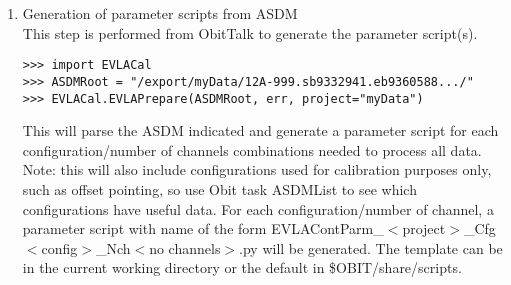 \documentclass[11pt]{article}
\begin{document}
\begin{enumerate}
\item Generation of parameter scripts from ASDM\\
This step is performed from ObitTalk to generate the parameter
script(s).
\begin{verbatim}
>>> import EVLACal
>>> ASDMRoot = "/export/myData/12A-999.sb9332941.eb9360588.../"
>>> EVLACal.EVLAPrepare(ASDMRoot, err, project="myData")
\end{verbatim}
This will parse the ASDM indicated and generate a parameter script for
each configuration/number of channels combinations needed to process
all data.
Note: this will also include configurations used for calibration
purposes only, such as offset pointing, so use Obit task ASDMList to see
which configurations have useful data.
For each configuration/number of channel, a parameter script with name
of the form EVLAContParm\_$<$project$>$\_Cfg$<$config$>$\_Nch$<$no channels$>$.py
will be generated.
The template can be in the current working directory or the default
in \$OBIT/share/scripts.


\end{enumerate}
\end{document}
